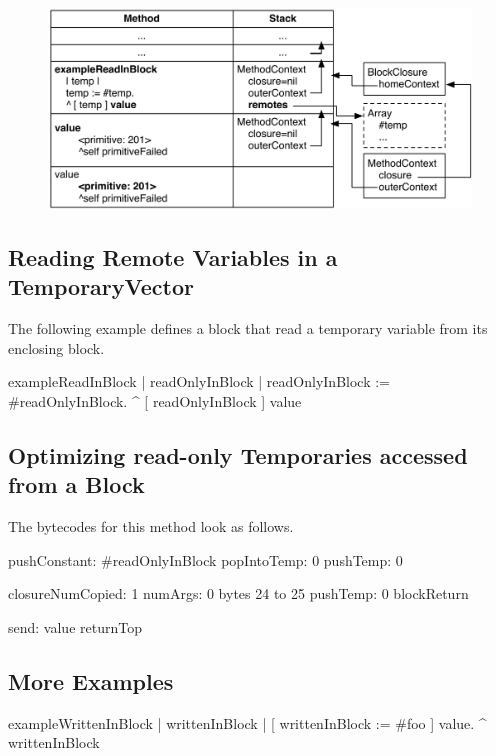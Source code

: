 \documentclass[a4paper,10pt,twoside]{book}
\begin{document}
\begin{figure}[H]
\begin{center}
\includegraphics[width=\textwidth]{BlockWithMethodContext}
\end{center}
\end{figure}



\subsection{Reading Remote Variables in a TemporaryVector}
The following example defines a block that read a temporary variable from its enclosing block.
\begin{code}{}
exampleReadInBlock
    | readOnlyInBlock |
    readOnlyInBlock := #readOnlyInBlock.
    ^ [ readOnlyInBlock ] value
\end{code}



\subsection{Optimizing read-only Temporaries accessed from a Block}
The bytecodes for this method look as follows.
\begin{code}{}
pushConstant: #readOnlyInBlock
popIntoTemp: 0
pushTemp: 0

closureNumCopied: 1 numArgs: 0 bytes 24 to 25
pushTemp: 0
blockReturn

send: value
returnTop
\end{code}


\subsection{More Examples}
\begin{code}{}
exampleWrittenInBlock
    | writtenInBlock |
    [ writtenInBlock := #foo ] value.
    ^ writtenInBlock
\end{code}
\end{document}
